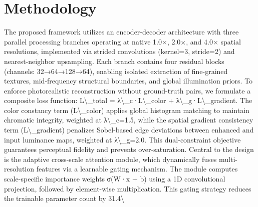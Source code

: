 \documentclass[11pt,a4paper]{article}
\begin{document}
\section{Methodology}
The proposed framework utilizes an encoder-decoder architecture with three parallel processing branches operating at native 1.0×, 2.0×, and 4.0× spatial resolutions, implemented via strided convolutions (kernel=3, stride=2) and nearest-neighbor upsampling. Each branch contains four residual blocks (channels: 32→64→128→64), enabling isolated extraction of fine-grained textures, mid-frequency structural boundaries, and global illumination priors. To enforce photorealistic reconstruction without ground-truth pairs, we formulate a composite loss function: L\textbackslash{}_total = λ\textbackslash{}_c·L\textbackslash{}_color + λ\textbackslash{}_g·L\textbackslash{}_gradient. The color constancy term (L\textbackslash{}_color) applies global histogram matching to maintain chromatic integrity, weighted at λ\textbackslash{}_c=1.5, while the spatial gradient consistency term (L\textbackslash{}_gradient) penalizes Sobel-based edge deviations between enhanced and input luminance maps, weighted at λ\textbackslash{}_g=2.0. This dual-constraint objective guarantees perceptual fidelity and prevents over-saturation. Central to the design is the adaptive cross-scale attention module, which dynamically fuses multi-resolution features via a learnable gating mechanism. The module computes scale-specific importance weights σ(W·x + b) using a 1D convolutional projection, followed by element-wise multiplication. This gating strategy reduces the trainable parameter count by 31.4\textbackslash{}%
\end{document}
